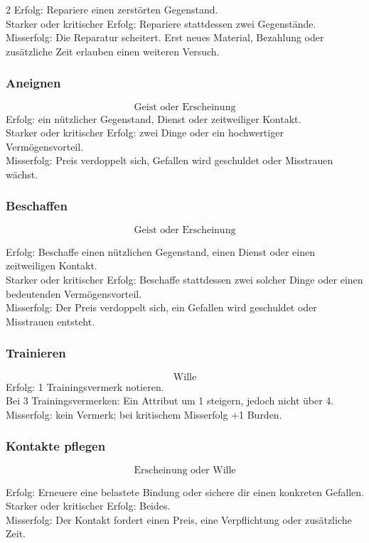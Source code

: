 \begin{multicols*}{2}
Erfolg: Repariere einen zerstörten Gegenstand.\\
Starker oder kritischer Erfolg: Repariere stattdessen zwei Gegenstände.\\
Misserfolg: Die Reparatur scheitert. Erst neues Material, Bezahlung oder zusätzliche Zeit erlauben einen weiteren Versuch.

\subsubsection{Aneignen}
\[
\text{Geist oder Erscheinung}
\]
Erfolg: ein nützlicher Gegenstand, Dienst oder zeitweiliger Kontakt.\\
Starker oder kritischer Erfolg: zwei Dinge oder ein hochwertiger Vermögensvorteil.\\
Misserfolg: Preis verdoppelt sich, Gefallen wird geschuldet oder Misstrauen wächst.

\subsubsection{Beschaffen}
\[
\text{Geist oder Erscheinung}
\]

Erfolg: Beschaffe einen nützlichen Gegenstand, einen Dienst oder einen zeitweiligen Kontakt.\\
Starker oder kritischer Erfolg: Beschaffe stattdessen zwei solcher Dinge oder einen bedeutenden Vermögensvorteil.\\
Misserfolg: Der Preis verdoppelt sich, ein Gefallen wird geschuldet oder Misstrauen entsteht.

\subsubsection{Trainieren}
\[
\text{Wille}
\]
Erfolg: 1 Trainingsvermerk notieren.\\
Bei 3 Trainingsvermerken: Ein Attribut um 1 steigern, jedoch nicht über 4.\\
Misserfolg: kein Vermerk; bei kritischem Misserfolg +1 Burden.

\subsubsection{Kontakte pflegen}
\[
\text{Erscheinung oder Wille}
\]

Erfolg: Erneuere eine belastete Bindung oder sichere dir einen konkreten Gefallen.\\
Starker oder kritischer Erfolg: Beides.\\
Misserfolg: Der Kontakt fordert einen Preis, eine Verpflichtung oder zusätzliche Zeit.


\end{multicols*}
